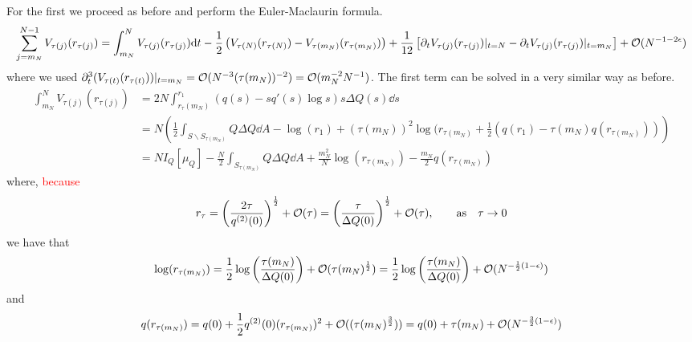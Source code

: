 For the first we proceed as before and perform the Euler-Maclaurin formula.
\begin{equation}
	\sum_{j=m_N}^{N-1} V_{\tau(j)}(r_{\tau(j)}) = \int_{m_N}^N V_{\tau(j)}(r_{\tau(j)})  \mathrm{d} t - \frac{1}{2} \left( V_{\tau(N)}(r_{\tau(N)})  - V_{\tau(m_N)}(r_{\tau(m_N)}) \right) + \frac{1}{12} \left[ \partial_t V_{\tau(j)}(r_{\tau(j)}) |_{t=N} - \partial_t V_{\tau(j)}(r_{\tau(j)}) |_{t=m_N} \right] + \mathcal{O}(N^{-1-2\epsilon})
\end{equation}
where we used $\partial^3_t(V_{\tau(t)}(r_{\tau(t)})) |_{t=m_N} = \mathcal{O}(N^{-3} (\tau(m_N))^{-2}) = \mathcal{O}(m_N^{-2} N^{-1})$. The first term can be solved in a very similar way as before.
\begin{align}
	\int_{m_N}^{N} V_{\tau(j)}(r_{\tau(j)}) & = 2N \int_{r_\tau(m_N)}^{r_1} (q(s) - s q'(s) \log s) s \Delta Q(s) \dd s \\
	& = N \left( \frac{1}{2} \int_{S \backslash S_{\tau(m_N)}} Q \Delta Q \dd A - \log(r_1) + (\tau(m_N))^2 \log(r_{\tau(m_N)} + \frac{1}{2} \left( q(r_1) - \tau(m_N) q(r_{\tau(m_N)}) \right) \right) \\
	& = N I_Q[\mu_Q] - \frac{N}{2} \int_{S_{\tau(m_N)}} Q \Delta Q \dd A + \frac{m_N^2}{N} \log(r_{\tau(m_N)}) - \frac{m_N}{2} q(r_{\tau(m_N)}) 
\end{align}
where, \textcolor{red}{because 
	\begin{equation}
		r_\tau = \left(\frac{2 \tau}{q^{(2)}(0)} \right)^{\frac{1}{2}} + \mathcal{O}(\tau) = \left(\frac{\tau}{\Delta Q(0)} \right)^{\frac{1}{2}} + \mathcal{O}(\tau), \qquad \text{as} \quad \tau \rightarrow 0
\end{equation}}
we have that
\begin{equation}
	\log(r_{\tau(m_N)}) = \frac{1}{2} \log{\left(\frac{\tau(m_N)}{\Delta Q(0)}\right)} + \mathcal{O}(\tau(m_N)^{\frac{1}{2}}) = \frac{1}{2} \log{\left(\frac{\tau(m_N)}{\Delta Q(0)}\right)} + \mathcal{O}(N^{-\frac{1}{2}(1-\epsilon)}) 
\end{equation}
and
\begin{equation}
	q(r_{\tau(m_N)}) = q(0) + \frac{1}{2} q^{(2)}(0)(r_{\tau(m_N)})^2 + \mathcal{O}((\tau(m_N)^{\frac{3}{2}})) = q(0) + \tau(m_N) + \mathcal{O}(N^{-\frac{3}{2}(1 - \epsilon)})
\end{equation}
